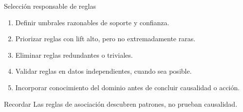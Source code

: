 \documentclass[10pt,aspectratio=169]{beamer}
\begin{document}
%
%
%
%
%
%

\begin{frame}{Selección responsable de reglas}
\begin{enumerate}
  \item Definir umbrales razonables de soporte y confianza.
  \item Priorizar reglas con lift alto, pero no extremadamente raras.
  \item Eliminar reglas redundantes o triviales.
  \item Validar reglas en datos independientes, cuando sea posible.
  \item Incorporar conocimiento del dominio antes de concluir causalidad o acción.
\end{enumerate}

\begin{block}{Recordar}
Las reglas de asociación descubren patrones, no prueban causalidad.
\end{block}
\end{frame}
\end{document}
